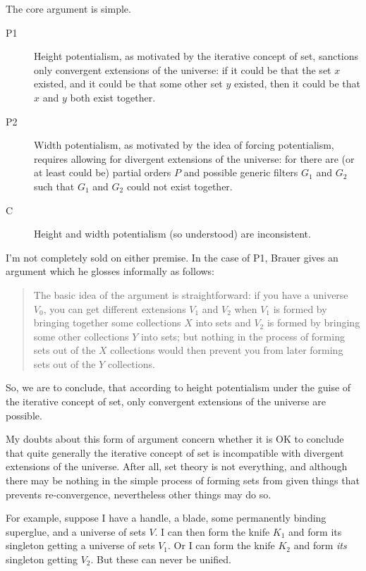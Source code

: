 \documentclass{article}
\begin{document}
The core argument is simple.
\begin{description}
    \item[P1] Height potentialism, as motivated by the iterative concept of set,
    sanctions only convergent extensions of the universe: if it could be that 
    the set $x$ existed, and it could be that some other set $y$ existed, 
    then it could be that $x$ and $y$ 
    both exist together.  
    \item[P2] Width potentialism, as motivated by the idea of forcing potentialism,
    requires allowing for divergent extensions of the universe: 
    for there are (or at least could be) partial orders 
    $P$ and possible generic filters $G_1$ and $G_2$ such that $G_1$ and $G_2$ 
    could not exist together.
    \item[C] Height and width potentialism (so understood) are inconsistent.
\end{description}
I'm not completely sold on either premise. In the case of P1,
Brauer gives an argument which he glosses informally as follows:
\begin{quote}
    The basic idea of the argument is straightforward: 
    if you have a universe $V_0$, you can get different extensions 
    $V_1$ and $V_2$ when $V_1$ 
    is formed by bringing together some collections $X$ into sets and 
    $V_2$ is formed by bringing some other collections $Y$ into sets; 
    but nothing in the process of forming sets out of the 
    $X$ collections would then prevent you from 
    later forming sets out of the $Y$ collections.
\end{quote}
So, we are to conclude, that according to height potentialism under the guise of
the iterative concept of set, only convergent extensions of the universe are possible.

My doubts about this form of argument concern whether it is OK to conclude 
that quite generally the iterative concept of set is incompatible with 
divergent extensions of the universe. After all, set theory is not everything, 
and although there may be nothing in the simple process of forming sets 
from given things that prevents 
re-convergence, nevertheless other things may do so. 

For example, suppose I have a handle, a blade, some permanently 
binding superglue, and a universe of sets $V$. I can then form the knife $K_1$
and form its singleton getting a universe of sets $V_1$. Or I can form 
the knife $K_2$ and form \emph{its} singleton getting $V_2$. But these 
can never be unified. 
\end{document}
